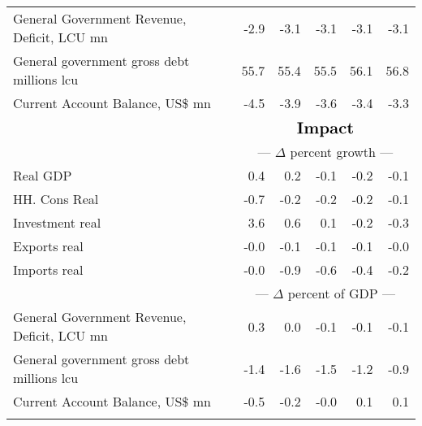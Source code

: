 \documentclass{article}
\begin{document}
\begin{table}[ht]
\begin{tabular}{lrrrrr}
General Government Revenue, Deficit, LCU mn & -2.9 & -3.1 & -3.1 & -3.1 & -3.1 \\
General government gross debt millions lcu & 55.7 & 55.4 & 55.5 & 56.1 & 56.8 \\
Current Account Balance, US\$ mn & -4.5 & -3.9 & -3.6 & -3.4 & -3.3 \\
&\multicolumn{5}{c}{{ }}                                                                                                     \\
&\multicolumn{5}{c}{{$\Large \textbf{Impact}$}}                                                                                                     \\
&\multicolumn{5}{c}{{--- $\Delta$  percent growth ---}}                                                                                                     \\
Real GDP & 0.4 & 0.2 & -0.1 & -0.2 & -0.1 \\
HH. Cons Real & -0.7 & -0.2 & -0.2 & -0.2 & -0.1 \\
Investment real & 3.6 & 0.6 & 0.1 & -0.2 & -0.3 \\
Exports real & -0.0 & -0.1 & -0.1 & -0.1 & -0.0 \\
Imports real & -0.0 & -0.9 & -0.6 & -0.4 & -0.2 \\
&\multicolumn{5}{c}{{--- $\Delta$  percent of GDP ---}}                                                                                                     \\
General Government Revenue, Deficit, LCU mn & 0.3 & 0.0 & -0.1 & -0.1 & -0.1 \\
General government gross debt millions lcu & -1.4 & -1.6 & -1.5 & -1.2 & -0.9 \\
Current Account Balance, US\$ mn & -0.5 & -0.2 & -0.0 & 0.1 & 0.1 \\
&\multicolumn{5}{c}{{ }}                                                                                                     \\
\bottomrule
\end{tabular}
\end{table}
 
\begin{figure}[htbp]
\centering
\resizebox{\textwidth}{!}{}
\caption{}
\end{figure}

 
\begin{figure}[htbp]
\centering
\resizebox{\textwidth}{!}{}
\caption{}
\end{figure}
\end{document}
